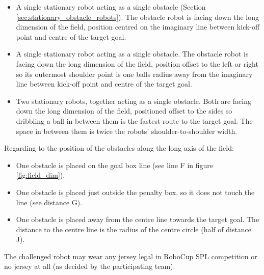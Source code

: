 \begin{itemize}
	\item A single stationary robot acting as a single obstacle (\cf Section \ref{sec:stationary_obstacle_robots}). The obstacle robot is facing down the long dimension of the field, position centred on the imaginary line between kick-off point and centre of the target goal.
	\item A single stationary robot acting as a single obstacle. The obstacle robot is facing down the long dimension of the field, position offset to the left or right so its outermost shoulder point is one balls radius away from the imaginary line between kick-off point and centre of the target goal. %
	\item Two stationary robots, together acting as a single obstacle. Both are facing down the long dimension of the field, positioned offset to the sides so dribbling a ball in between them is the fastest route to the target goal. The space in between them is twice the robots' shoulder-to-shoulder width. %
\end{itemize}

Regarding to the position of the obstacles along the long axis of the field:

\begin{itemize}
	\item One obstacle is placed on the goal box line (see line F in figure \ref{fig:field_dim}).
	\item One obstacle is placed just outside the penalty box, so it does not touch the line (see distance  G).
	\item One obstacle is placed away from the centre line towards the target goal. The distance to the centre line is the radius of the centre circle (half of distance J).
\end{itemize}

The challenged robot may wear any jersey legal in RoboCup SPL competition or no jersey at all (as decided by the participating team).

